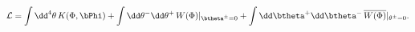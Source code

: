 \begin{equation}
{\mathcal L}
=\int \dd^4\theta\,
K(\Phi,\bPhi)
+\int \dd\theta^-\dd\theta^+\,W(\Phi)|_{\btheta^{\pm}=0}
+\int \dd\btheta^+\dd\btheta^-\,
\overline{W(\Phi)}|_{\theta^{\pm}=0}.
\label{actionLG}
\end{equation}

